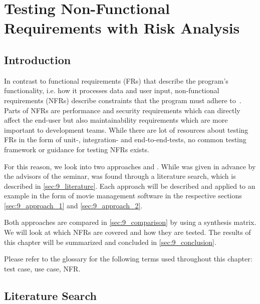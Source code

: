 %
%
%

\chapter{Testing Non-Functional Requirements with Risk Analysis}\label{sec:topic_9}


\section{Introduction}

In contrast to functional requirements (FRs) that describe the program's functionality, i.e. how it processes data and user input, non-functional requirements (NFRs) describe constraints that the program must adhere to~\cite{SWEBOK}.
Parts of NFRs are performance and security requirements which can directly affect the end-user but also maintainability requirements which are more important to development teams.
While there are lot of resources about testing FRs in the form of unit-, integration- and end-to-end-tests, no common testing framework or guidance for testing NFRs exists.

For this reason, we look into two approaches \cite{ZouPavlovski2008} and \cite{Lagerstedt2014}.
While \cite{ZouPavlovski2008} was given in advance by the advisors of the seminar, \cite{Lagerstedt2014} was found through a literature search, which is described in \autoref{sec:9_literature}.
Each approach will be described and applied to an example in the form of movie management software in the respective sections \ref{sec:9_approach_1} and \ref{sec:9_approach_2}. 

Both approaches are compared in \autoref{sec:9_comparison} by using a synthesis matrix. We will look at which NFRs are covered and how they are tested.
The results of this chapter will be summarized and concluded in \autoref{sec:9_conclusion}.

Please refer to the glossary for the following terms used throughout this chapter:
test case, use case, NFR.




\section{Literature Search} \label{sec:9_literature}

